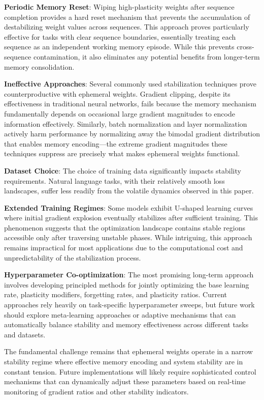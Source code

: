 \documentclass[conference]{IEEEtran}
\begin{document}
\textbf{Periodic Memory Reset}: Wiping high-plasticity weights after sequence completion provides a hard reset mechanism that prevents the accumulation of destabilizing weight values across sequences. This approach proves particularly effective for tasks with clear sequence boundaries, essentially treating each sequence as an independent working memory episode. While this prevents cross-sequence contamination, it also eliminates any potential benefits from longer-term memory consolidation.

\textbf{Ineffective Approaches}: Several commonly used stabilization techniques prove counterproductive with ephemeral weights. Gradient clipping, despite its effectiveness in traditional neural networks, fails because the memory mechanism fundamentally depends on occasional large gradient magnitudes to encode information effectively. Similarly, batch normalization and layer normalization actively harm performance by normalizing away the bimodal gradient distribution that enables memory encoding—the extreme gradient magnitudes these techniques suppress are precisely what makes ephemeral weights functional.

\textbf{Dataset Choice}: The choice of training data significantly impacts stability requirements. Natural language tasks, with their relatively smooth loss landscapes, suffer less readily from the volatile dynamics observed in this paper. 

\textbf{Extended Training Regimes}: Some models exhibit U-shaped learning curves where initial gradient explosion eventually stabilizes after sufficient training. This phenomenon suggests that the optimization landscape contains stable regions accessible only after traversing unstable phases. While intriguing, this approach remains impractical for most applications due to the computational cost and unpredictability of the stabilization process.

\textbf{Hyperparameter Co-optimization}: The most promising long-term approach involves developing principled methods for jointly optimizing the base learning rate, plasticity modifiers, forgetting rates, and plasticity ratios. Current approaches rely heavily on task-specific hyperparameter sweeps, but future work should explore meta-learning approaches or adaptive mechanisms that can automatically balance stability and memory effectiveness across different tasks and datasets.

The fundamental challenge remains that ephemeral weights operate in a narrow stability regime where effective memory encoding and system stability are in constant tension. Future implementations will likely require sophisticated control mechanisms that can dynamically adjust these parameters based on real-time monitoring of gradient ratios and other stability indicators.
\end{document}
